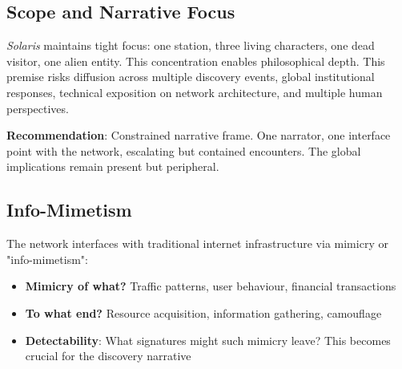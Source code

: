 \subsection*{Scope and Narrative Focus}

\textit{Solaris} maintains tight focus: one station, three living characters, one dead visitor, one alien entity. This concentration enables philosophical depth. This premise risks diffusion across multiple discovery events, global institutional responses, technical exposition on network architecture, and multiple human perspectives.

\textbf{Recommendation}: Constrained narrative frame. One narrator, one interface point with the network, escalating but contained encounters. The global implications remain present but peripheral.

\subsection*{Info-Mimetism}

The network interfaces with traditional internet infrastructure via mimicry or "info-mimetism":

\begin{itemize}
\item \textbf{Mimicry of what?} Traffic patterns, user behaviour, financial transactions
\item \textbf{To what end?} Resource acquisition, information gathering, camouflage
\item \textbf{Detectability}: What signatures might such mimicry leave? This becomes crucial for the discovery narrative
\end{itemize}
